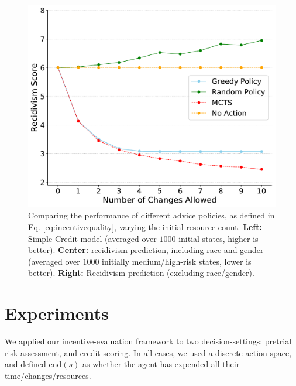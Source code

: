 \begin{figure}
\includegraphics[width=\linewidth]{figures/compas_ni.pdf}
\endminipage\hfill
    \caption{Comparing the performance of different advice policies, as defined in Eq. \ref{eq:incentivequality}, varying the initial resource count.
    \textbf{Left:} Simple Credit model (averaged over $1000$ initial states, higher is better). \textbf{Center:} recidivism prediction, including race and gender (averaged over $1000$ initially medium/high-risk states, lower is better). \textbf{Right:} Recidivism prediction (excluding race/gender).}
    \label{fig:policycomparison}
\end{figure}
\section{Experiments}
\label{sec:experiments}
We applied our incentive-evaluation framework to two decision-settings: pretrial risk assessment, and credit scoring. In all cases, we used a discrete action space, and defined $\text{end}(s)$ as whether the agent has expended all their time/changes/resources.

